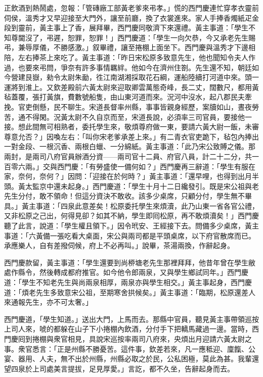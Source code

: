 正飲酒到熱鬧處，忽報：「管磚廠工部黃老爹來弔孝。」慌的西門慶連忙穿孝衣靈前伺侯，溫秀才又早迎接至大門外，讓至前廳，換了衣裳進來。家人手捧香燭紙疋金段到靈前，黃主事上了香，展拜畢，西門慶同敬濟下來還禮。黃主事道：「學生不知尊閫沒了，弔遲，恕罪，恕罪！」西門慶道：「學生一向欠恭，今又承老先生賜弔，兼辱厚儀，不勝感激。」叙畢禮，讓至捲棚上面坐下。西門慶與溫秀才下邊相陪，左右捧茶上來吃了。黃主事道：「昨日宋松原多致意先生，他也聞知令夫人作過，也要來弔問，爭奈有許多事情羈絆。他如今在濟州住劄。先生還不知，朝廷如今營建艮嶽，勑令太尉朱勔，徃江南湖湘採取花石綱，運船陸續打河道中來。頭一運將到淮上。又欽差殿前六黃太尉來迎取卿雲萬態奇峰，長二丈，闊數尺，都用黃毡蓋覆，張打黃旗，費數號船隻，由山東河道而來。況河中沒水，起八郡民夫牽挽。官吏倒懸，民不聊生。{}宋道長督率州縣，事事皆親身經歷，案牘如山，晝夜勞苦，通不得閑。況黃太尉不久自京而至，宋道長說，必須率三司官員，要接他一接。想此間無可相熟者，委托學生來，敬煩尊府做一東，要請六黃大尉一飯，未審尊意允否？」因喚左右：「叫你宋老爹承差上來。」有二青衣官吏跪下，毡包內捧出一對金段、一根沉香、兩根白蠟、一分綿紙。黃主事道：「此乃宋公致賻之儀。那兩封，是兩司八府官員辦酒分資——兩司官十二員、府官八員，計二十二分，共一百零六兩。」交與西門慶：「有勞盛使一備何如？」西門慶再三辭道：「學生有服在家，奈何，奈何？」因問：「迎接在於何時？」黃主事道：「還早哩，也得到出月半頭。黃太監京中還未起身。」西門慶道：「學生十月十二日纔發引。既是宋公祖與老先生分付，敢不領命！但這分資決不敢收。該多少桌席，只顧分付，學生無不畢具。」黃主事道：「四泉此意差矣！松原委托學生來煩瀆，此乃山東一省各官公禮，又非松原之己出，何得見卻？如其不納，學生即囘松原，再不敢煩瀆矣！」{}西門慶聽了此言，說道：「學生權且領下。」因令玳安、王經接下去。問備多少桌席，黃主事道：「六黃備一張吃看大桌面，宋公與兩司都是平頭桌席，以下府官散席而已。承應樂人，自有差撥伺候，府上不必再叫。」說畢，茶湯兩換，作辭起身。

西門慶款留，黃主事道：「學生還要到尚桺塘老先生那裡拜拜，他昔年曾在學生敝處作縣令，然後轉成都府推官。如今他令郎兩泉，又與學生鄉試同年。」{}西門慶道：「學生不知老先生與尚兩泉相厚，兩泉亦與學生相交。」黃主事起身，西門慶道：「煩老先生多致意宋公祖，至期寒舍拱候矣。」黃主事道：「臨期，松原還差人來通報先生，亦不可太奢。」

西門慶道，「學生知道。」送出大門，上馬而去。那縣中官員，聽見黃主事帶領巡按上司人來，唬的都躲在山子下小捲棚內飲酒，分付手下把轎馬藏過一邊。{}當時，西門慶囘到捲棚與衆官相見，具說宋巡按率兩司八府來，央煩出月迎請六黃太尉之事。衆官悉言：「正是州縣不勝憂苦。這件事，欽差若來，凡一應秪迎、廩餼、公宴、器用、人夫，無不出於州縣，州縣必取之於民，公私困極，莫此為甚。我輩還望四泉於上司處美言提拔，足見厚愛。」言訖，都不久坐，告辭起身而去。

